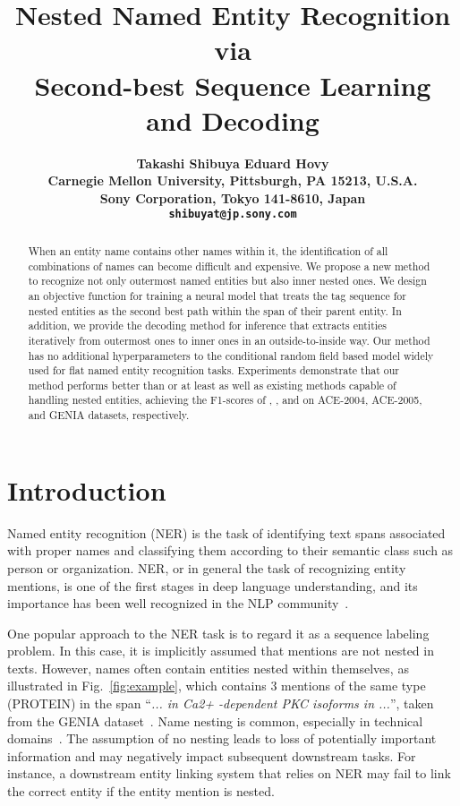 \documentclass[11pt,a4paper]{article}
\title{Nested Named Entity Recognition via \\ Second-best Sequence Learning and Decoding}
\author{\bf{Takashi Shibuya} \quad \bf{Eduard Hovy} \\
   Carnegie Mellon University, Pittsburgh, PA 15213, U.S.A. \\
   Sony Corporation, Tokyo 141-8610, Japan \\ 
  {\tt shibuyat@jp.sony.com} \quad {\tt hovy@cmu.edu} \\}
\date{}
\def\figref#1{Fig.~\ref{#1}}
\begin{document}
\maketitle
\begin{abstract}
  When an entity name contains other names within it, the identification of all combinations of names can become difficult and expensive.   
  We propose a new method to recognize not only outermost named entities but also inner nested ones.
  We design an objective function for training a neural model that treats the tag sequence for nested entities as the second best path within the span of their parent entity.
  In addition, we provide the decoding method for inference that extracts entities iteratively from outermost ones to inner ones in an outside-to-inside way.
  Our method has no additional hyperparameters to the conditional random field based model widely used for flat named entity recognition tasks.
  Experiments demonstrate that our method performs better than or at least as well as existing methods capable of handling nested entities, achieving the F1-scores of , , and  on ACE-2004, ACE-2005, and GENIA datasets, respectively.
\end{abstract}

\section{Introduction}

Named entity recognition (NER) is the task of identifying text spans associated with proper names and classifying them according to their semantic class such as person or organization.
NER, or in general the task of recognizing entity mentions, is one of the first stages in deep language understanding, and its importance has been well recognized in the NLP community~\cite{Nadeau:2007}.

One popular approach to the NER task is to regard it as a sequence labeling problem.
In this case, it is implicitly assumed that mentions are not nested in texts.
However, names often contain entities nested within themselves, as illustrated in \figref{fig:example}, which contains 3 mentions of the same type (PROTEIN) in the span ``{\it ... in Ca2+ -dependent PKC isoforms in ...}'', taken from the GENIA dataset~\cite{Kim:2003}.
Name nesting is common, especially in technical domains~\cite{alex-etal-2007-recognising,byrne2007,wang-2009-annotating}.
The assumption of no nesting leads to loss of potentially important information and may negatively impact subsequent downstream tasks.
For instance, a downstream entity linking system that relies on NER may fail to link the correct entity if the entity mention is nested.
\end{document}
